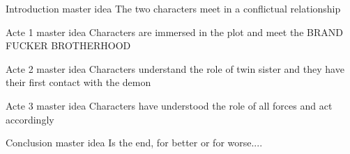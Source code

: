 \begin{synopsis}

Introduction master idea
The two characters meet in a conflictual relationship

Acte 1 master idea
Characters are immersed in the plot and meet the BRAND FUCKER BROTHERHOOD

Acte 2 master idea
Characters understand the role of twin sister and they have their first contact with the demon

Acte 3 master idea
Characters have understood the role of all forces and act accordingly

Conclusion master idea
Is the end, for better or for worse....

\end{synopsis}
